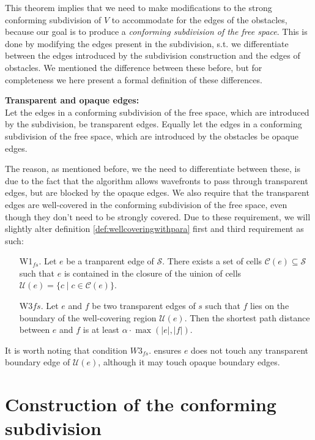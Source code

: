 This theorem implies that we need to make modifications to the strong conforming 
subdivision of $V$ to accommodate for the edges of the obstacles, because our goal is 
to produce a \textit{conforming subdivision of the free space}. This is done by 
modifying the edges present in the subdivision, s.t. we differentiate between the edges 
introduced by the subdivision construction and the edges of obstacles. We mentioned the 
difference between these before, but for completeness we here present a formal 
definition of these differences.

\begin{mydef}\textbf{Transparent and opaque edges:}\\
    Let the edges in a conforming subdivision of the free space, which are introduced by 
    the subdivision, be transparent edges. Equally let the edges in a conforming 
    subdivision of the free space, which are introduced by the obstacles be 
    opaque edges. 
\end{mydef}

The reason, as mentioned before, we the need to differentiate between these, is due to the 
fact that the algorithm allows wavefronts to pass through transparent edges, but are blocked 
by the opaque edges. We also require that the transparent edges are well-covered in the 
conforming subdivision of the free space, even though they don't need to be strongly 
covered. Due to these requirement, we will slightly alter definition 
\ref{def:wellcoveringwithpara} first and third requirement as such:

\begin{enumerate}
\item[W1$_{fs}$.] Let $e$ be a tranparent edge of $\mathcal{S}$. There exists a set of 
    cells $\mathcal{C}(e)\subseteq\mathcal{S}$ such that $e$ is contained in the closure 
    of the uinion of cells $\mathcal{U}(e)=\{c \mid c\in\mathcal{C}(e)\}$.
\item[W3${fs}$.] Let $e$ and $f$ be two transparent edges of $s$ such that $f$ lies on 
    the boundary of the well-covering region $\mathcal{U}(e)$. Then the shortest path 
    distance between $e$ and $f$ is at least $\alpha\cdot\max(|e|,|f|)$. 
\end{enumerate}

It is worth noting that condition $W3_{fs}.$ ensures $e$ does not touch any transparent 
boundary edge of $\mathcal{U}(e)$, although it may touch opaque boundary edges.

\section{Construction of the conforming subdivision}

